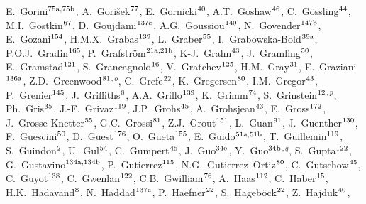 \begin{flushleft}
E.~Gorini$^\textrm{\scriptsize 75a,75b}$,
A.~Gori\v{s}ek$^\textrm{\scriptsize 77}$,
E.~Gornicki$^\textrm{\scriptsize 40}$,
A.T.~Goshaw$^\textrm{\scriptsize 46}$,
C.~G\"ossling$^\textrm{\scriptsize 44}$,
M.I.~Gostkin$^\textrm{\scriptsize 67}$,
D.~Goujdami$^\textrm{\scriptsize 137c}$,
A.G.~Goussiou$^\textrm{\scriptsize 140}$,
N.~Govender$^\textrm{\scriptsize 147b}$,
E.~Gozani$^\textrm{\scriptsize 154}$,
H.M.X.~Grabas$^\textrm{\scriptsize 139}$,
L.~Graber$^\textrm{\scriptsize 55}$,
I.~Grabowska-Bold$^\textrm{\scriptsize 39a}$,
P.O.J.~Gradin$^\textrm{\scriptsize 165}$,
P.~Grafstr\"om$^\textrm{\scriptsize 21a,21b}$,
K-J.~Grahn$^\textrm{\scriptsize 43}$,
J.~Gramling$^\textrm{\scriptsize 50}$,
E.~Gramstad$^\textrm{\scriptsize 121}$,
S.~Grancagnolo$^\textrm{\scriptsize 16}$,
V.~Gratchev$^\textrm{\scriptsize 125}$,
H.M.~Gray$^\textrm{\scriptsize 31}$,
E.~Graziani$^\textrm{\scriptsize 136a}$,
Z.D.~Greenwood$^\textrm{\scriptsize 81}$$^{,o}$,
C.~Grefe$^\textrm{\scriptsize 22}$,
K.~Gregersen$^\textrm{\scriptsize 80}$,
I.M.~Gregor$^\textrm{\scriptsize 43}$,
P.~Grenier$^\textrm{\scriptsize 145}$,
J.~Griffiths$^\textrm{\scriptsize 8}$,
A.A.~Grillo$^\textrm{\scriptsize 139}$,
K.~Grimm$^\textrm{\scriptsize 74}$,
S.~Grinstein$^\textrm{\scriptsize 12}$$^{,p}$,
Ph.~Gris$^\textrm{\scriptsize 35}$,
J.-F.~Grivaz$^\textrm{\scriptsize 119}$,
J.P.~Grohs$^\textrm{\scriptsize 45}$,
A.~Grohsjean$^\textrm{\scriptsize 43}$,
E.~Gross$^\textrm{\scriptsize 172}$,
J.~Grosse-Knetter$^\textrm{\scriptsize 55}$,
G.C.~Grossi$^\textrm{\scriptsize 81}$,
Z.J.~Grout$^\textrm{\scriptsize 151}$,
L.~Guan$^\textrm{\scriptsize 91}$,
J.~Guenther$^\textrm{\scriptsize 130}$,
F.~Guescini$^\textrm{\scriptsize 50}$,
D.~Guest$^\textrm{\scriptsize 176}$,
O.~Gueta$^\textrm{\scriptsize 155}$,
E.~Guido$^\textrm{\scriptsize 51a,51b}$,
T.~Guillemin$^\textrm{\scriptsize 119}$,
S.~Guindon$^\textrm{\scriptsize 2}$,
U.~Gul$^\textrm{\scriptsize 54}$,
C.~Gumpert$^\textrm{\scriptsize 45}$,
J.~Guo$^\textrm{\scriptsize 34e}$,
Y.~Guo$^\textrm{\scriptsize 34b}$$^{,q}$,
S.~Gupta$^\textrm{\scriptsize 122}$,
G.~Gustavino$^\textrm{\scriptsize 134a,134b}$,
P.~Gutierrez$^\textrm{\scriptsize 115}$,
N.G.~Gutierrez~Ortiz$^\textrm{\scriptsize 80}$,
C.~Gutschow$^\textrm{\scriptsize 45}$,
C.~Guyot$^\textrm{\scriptsize 138}$,
C.~Gwenlan$^\textrm{\scriptsize 122}$,
C.B.~Gwilliam$^\textrm{\scriptsize 76}$,
A.~Haas$^\textrm{\scriptsize 112}$,
C.~Haber$^\textrm{\scriptsize 15}$,
H.K.~Hadavand$^\textrm{\scriptsize 8}$,
N.~Haddad$^\textrm{\scriptsize 137e}$,
P.~Haefner$^\textrm{\scriptsize 22}$,
S.~Hageb\"ock$^\textrm{\scriptsize 22}$,
Z.~Hajduk$^\textrm{\scriptsize 40}$,
$$
\end{flushleft}

